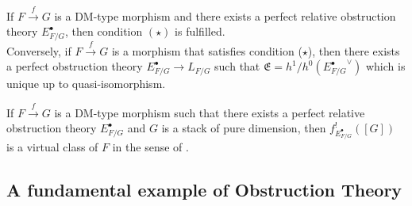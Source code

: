 \begin{proposition}\label{manolacheVirtualPullbacks2012-prop-3.11}
If $F\stackrel{f}\rightarrow G$ is a DM-type morphism and there exists a perfect relative obstruction theory $E_{F/G}^{\bullet}$, then condition $(\star)$ is fulfilled.
\\Conversely, if $F\stackrel{f}\rightarrow G$ is a morphism that satisfies condition ($\star$), then there exists a perfect obstruction theory $E^{\bullet}_{F/G}\to L_{F/G}$ such that $\mathfrak{E}=h^1/h^0({E^{\bullet}_{F/G}}^{\vee})$ which is unique up to quasi-isomorphism.
\end{proposition}

\begin{corollary}\label{manolacheVirtualPullbacks2012-cor-3.12}
\label{manolacheVirtualPullbacks2012-extrasmooth}
If $F\stackrel{f}\rightarrow G$ is a DM-type morphism such that there exists a perfect relative obstruction theory $E^{\bullet}_{F/G}$ and $G$ is a stack of pure dimension, then $f^!_{E^{\bullet}_{F/G}}([G])$ is a virtual class of $F$ in the sense of \cite{bf}.
\end{corollary}

\subsection{A fundamental example of Obstruction Theory}\label{manolacheVirtualPullbacks2012-sec-3.2}

